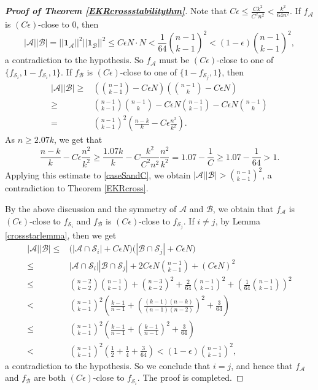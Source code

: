 \documentclass[11pt]{article}
\numberwithin{equation}{section}
\def\A{\mathcal{A}}
\def\B{\mathcal{B}}
\def\S{\mathcal{S}}
\def\f{\mathbf{f}}
\def\1{\mathbf{1}}
\begin{document}
\begin{proof}[{\bf Proof of Theorem \ref{EKRcrossstabilitythm}}]
Note that $C\epsilon\leq \frac{Ck^2}{C^2n^2} <\frac{k^2}{64n^2}$.
If $f_\A$ is $(C\epsilon)$-close to $0$, then %
$$|\A| |\B|= ||\1_\A||^2  ||\1_\B||^2 \leq C\epsilon N \cdot N
<\frac{1}{64} \binom{n-1}{k-1}^2 <(1-\epsilon)\binom{n-1}{k-1}^2,$$
a contradiction to the hypothesis.
So $f_\A$ must be $(C\epsilon)$-close to one of
$\{f_{\S_i},1-f_{\S_i},1\}$.
If $f_\B$ is $(C\epsilon)$-close to one of $\{1-f_{\S_j},1\}$, then
\begin{align}\nonumber
|\A| |\B|
\geq &
\left( \binom{n-1}{k-1} -C\epsilon N  \right)\left( \binom{n-1}{k } -C\epsilon N  \right)\\\nonumber
\geq&\binom{n-1}{k-1}\binom{n-1}{k }
- C\epsilon N\binom{n-1}{k-1} - C\epsilon N \binom{n-1}{k } \\\label{caseSandC}
=&  \binom{n-1}{k-1}^2 \left(\frac{n-k}{k}-C\epsilon\frac{n^2}{k^2}   \right).
\end{align}
As $n\geq 2.07k$, we get that %
$$\frac{n-k}{k}- C\epsilon\frac{n^2}{k^2}
\geq \frac{1.07k}{k}- C\frac{k^2}{  C^2 n ^2 }\frac{n^2}{k^2}
=  1.07- \frac{1}{C}\geq 1.07- \frac{1}{64}>1.$$
Applying this estimate to \eqref{caseSandC}, we obtain $|\A| |\B|>\binom{n-1}{k-1}^2$,
a contradiction to Theorem \ref{EKRcross}.



By the above discussion and the symmetry of $\A$ and $\B$,
we obtain that $f_\A$ is $(C\epsilon)$-close to $f_{\S_i}$
and $f_\B$ is $(C\epsilon)$-close to $f_{\S_j}$.
If $i\neq j$, by Lemma \ref{crossstarlemma}, then we get
\begin{align*}
|\A| |\B|\leq & \big(| \A\cap \mathcal{S}_i|+ C\epsilon N\big)
\big(|\B \cap \mathcal{S}_j| + C\epsilon N\big)\\
\leq & | \A\cap \mathcal{S}_i| | \B\cap \mathcal{S}_j|
+ 2C\epsilon N \binom{n-1}{k-1}+ (C\epsilon N)^2\\
\leq& \binom{n-2}{k-2}\binom{n-1}{k-1}+\binom{n-3}{k-2}^2
+ \frac{2}{64}\binom{n-1}{k-1}^2 + \left(\frac{1}{64 }\binom{n-1}{k-1} \right)^2\\
<& \binom{n-1}{k-1}^2\left(\frac{k-1}{n-1}
+ \left(\frac{(k-1)(n-k)}{(n-1)(n-2)}\right)^2+ \frac{3}{64} \right)\\
\leq & \binom{n-1}{k-1}^2\left(\frac{k-1}{n-1}
+ \left(\frac{k-1}{n-1}\right)^2+ \frac{3}{64} \right)\\
< & \binom{n-1}{k-1}^2\left(\frac{1}{2}+\frac{1}{4} + \frac{3}{64} \right) <(1-\epsilon)\binom{n-1}{k-1}^2,
\end{align*}
a contradiction to the hypothesis.
So we conclude that $i=j$, and hence that $f_\A$ and $f_\B$ are both $(C\epsilon)$-close to $f_{\S_i}$.
The proof is completed.
\end{proof}
\end{document}
